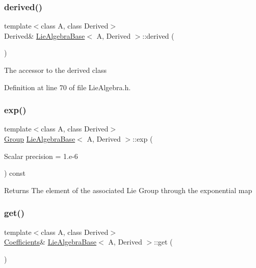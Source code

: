 \subsubsection{\texorpdfstring{derived()}{derived()}\hspace{0.1cm}{\footnotesize\ttfamily [2/2]}}
{\footnotesize\ttfamily template$<$class A, class Derived$>$ \\
Derived\& \hyperlink{class_lie_algebra_base}{Lie\+Algebra\+Base}$<$ A, Derived $>$\+::derived (\begin{DoxyParamCaption}{ }\end{DoxyParamCaption})\hspace{0.3cm}{\ttfamily [inline]}}

The accessor to the derived class 

Definition at line 70 of file Lie\+Algebra.\+h.

\hypertarget{class_lie_algebra_base_aafe7d43a29d43aed54dd91b3a3a4c9f7}{}\label{class_lie_algebra_base_aafe7d43a29d43aed54dd91b3a3a4c9f7} 
\subsubsection{\texorpdfstring{exp()}{exp()}}
{\footnotesize\ttfamily template$<$class A, class Derived$>$ \\
\hyperlink{class_lie_algebra_base_aab4a5b7a728102ffe801534c0fc10d79}{Group} \hyperlink{class_lie_algebra_base}{Lie\+Algebra\+Base}$<$ A, Derived $>$\+::exp (\begin{DoxyParamCaption}\item[{Scalar}]{precision = {\ttfamily 1.e-\/6} }\end{DoxyParamCaption}) const}

\begin{DoxyReturn}{Returns}
The element of the associated Lie Group through the exponential map 
\end{DoxyReturn}
\hypertarget{class_lie_algebra_base_ae98f35321a261257a8aeee7d8388df2d}{}\label{class_lie_algebra_base_ae98f35321a261257a8aeee7d8388df2d} 
\subsubsection{\texorpdfstring{get()}{get()}\hspace{0.1cm}{\footnotesize\ttfamily [1/2]}}
{\footnotesize\ttfamily template$<$class A, class Derived$>$ \\
\hyperlink{class_lie_algebra_base_a8e61a02d3c5f7a0b4bd87a4ccd47dc9a}{Coefficients}\& \hyperlink{class_lie_algebra_base}{Lie\+Algebra\+Base}$<$ A, Derived $>$\+::get (\begin{DoxyParamCaption}{ }\end{DoxyParamCaption})\hspace{0.3cm}{\ttfamily [inline]}}

